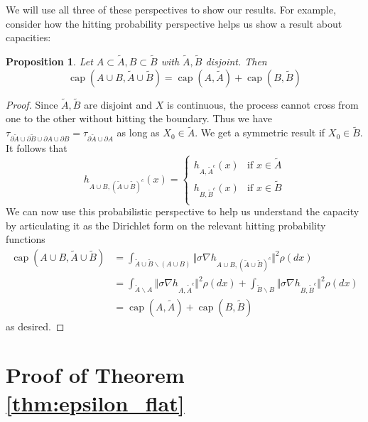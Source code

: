 \documentclass[12pt, nofootinbib,english, amsmath, amssymb, aps, priprint, graphicx,floatfix]{revtex4-1}
\newtheorem{proposition}{Proposition}
\theoremstyle{plain}
\theoremstyle{definition}
\theoremstyle{plain}
\newcommand{\capac}[2]{\ensuremath{\operatorname{cap}}(#1,#2)}
\begin{document}
We will use all three of these perspectives to show our results.  For example, consider how the hitting probability perspective helps us show a result about capacities:
\begin{proposition}\label{prop:capacity}
Let $A\subset \tilde A,B\subset \tilde B$ with $\tilde A,\tilde B$ disjoint.  Then 
\[
\capac{A\cup B}{\tilde A \cup \tilde B}=\capac{A}{\tilde A}+\capac{B}{\tilde B}
\]
\end{proposition}
\begin{proof}
Since $\tilde A,\tilde B$ are disjoint and $X$ is continuous, the process cannot cross from one to the other without hitting the boundary.  Thus we have $\tau_{\partial \tilde A\cup \partial \tilde B \cup \partial A \cup \partial B}=\tau_{\partial \tilde A \cup \partial A}$ as long as $X_0\in\tilde A$.  We get a symmetric result if $X_0\in \tilde B$.  It follows that
\[
h_{A\cup B,(\tilde A\cup\tilde B)^c}(x) = 
    \begin{cases}
    h_{A,\tilde A^c}(x) & \mbox{if }x\in \tilde A\\
    h_{B,\tilde B^c}(x) & \mbox{if }x\in \tilde B\\
    \end{cases}
\]
We can now use this probabilistic perspective to help us understand the capacity by articulating it as the Dirichlet form on the relevant hitting probability functions
\begin{align*}
\capac{A\cup B}{\tilde A \cup \tilde B} 
        &= \int_{\tilde A\cup \tilde B \backslash (A\cup B)} \Vert \sigma \nabla h_{A\cup B,(\tilde A \cup \tilde B)^c}\Vert^2\rho(dx) \\
        &= \int_{\tilde A \backslash A} \Vert \sigma \nabla h_{A,\tilde A^c}\Vert^2\rho(dx)
            +\int_{\tilde B \backslash B} \Vert \sigma \nabla h_{B,\tilde B^c}\Vert^2 \rho(dx) \\
        &= \capac{A}{\tilde A}+\capac{B}{\tilde B}
\end{align*}
as desired.
\end{proof}

                                                       



\section{Proof of Theorem \ref{thm:epsilon_flat}}
\label{sec:proof_epsilon_flat}
\end{document}
